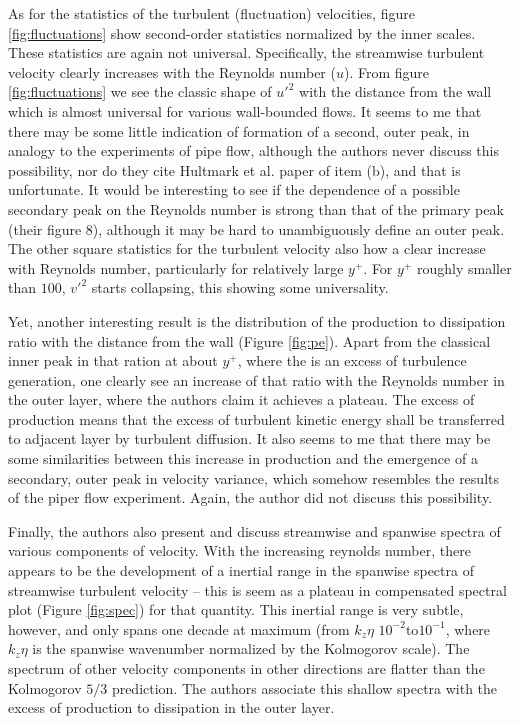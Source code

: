 \documentclass[11pt]{article}
\begin{document}
\begin{enumerate}[label=(\alph*)]
        As for the statistics of the turbulent (fluctuation) velocities, figure \ref{fig:fluctuations} show
        second-order statistics normalized by the inner scales. These statistics are again not universal.
        Specifically, the streamwise turbulent velocity clearly increases with the Reynolds number 
        ($u$). From  figure \eqref{fig:fluctuations} we see the classic shape of $u'^2$ with the distance
        from the wall which is almost universal for various wall-bounded flows.
        It seems to me that there may be
        some little indication of formation of a second, outer peak, in analogy to the experiments of 
        pipe flow, although the authors never discuss this possibility, nor do they cite Hultmark et al.
        paper of item (b), and that is unfortunate. It would be interesting to see if the dependence of 
        a possible secondary peak on the Reynolds number is strong than that of the primary peak
        (their figure 8), although it may be hard to unambiguously define an outer peak. The other
        square statistics for the turbulent velocity also how a clear increase with Reynolds number,
        particularly for relatively large $y^+$. For $y^+$ roughly smaller than  $100$, $v'^2$ starts
        collapsing, this showing some universality. 

        Yet, another interesting result is the distribution of the production to dissipation ratio
        with the distance from the wall (Figure \ref{fig:pe}). Apart from the classical inner
        peak in that ration at about $y^+$, where the is an excess of turbulence generation, one
        clearly see an increase of that ratio with the Reynolds number in the outer layer, where
        the authors claim it achieves a plateau. The excess of production means that the excess
        of turbulent kinetic energy shall be transferred to adjacent layer by turbulent diffusion.
        It also seems to me that there may be some similarities between this increase in production
        and the emergence of a secondary, outer peak in velocity variance, which somehow resembles
        the results of the piper flow experiment. Again, the author did not discuss this possibility.

        Finally, the authors also present and discuss streamwise and spanwise spectra of various 
        components of velocity. With the increasing reynolds number, there appears to be the 
        development of a inertial range in the spanwise spectra of streamwise turbulent velocity –
        this is seem as a plateau in compensated spectral plot (Figure \ref{fig:spec}) for that quantity. This
         inertial range is very subtle, however, and only spans one decade at maximum (from $k_z \eta$
         $10^{-2} \text{to} 10^{-1}$, where $k_z\eta$ is the spanwise wavenumber normalized by the Kolmogorov
         scale). The spectrum of other velocity components in other directions are flatter than the 
         Kolmogorov $5/3$ prediction. The authors associate this shallow spectra with the excess of
         production to dissipation in the outer layer.



\end{enumerate}
\end{document}
